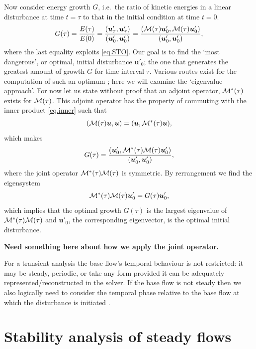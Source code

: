 \documentclass[11pt,a4paper]{report}
\newcommand{\ie}{i.e.\ }
\newcommand\uvec{\bm{u}}
\newcommand\Mop{{\cal M}}
\newcommand\Madj{{\cal M^*}}
\begin{document}
Now consider energy growth $G$, \ie the ratio of kinetic energies in a
linear disturbance at time $t=\tau$ to that in the initial condition
at time $t=0$.
\begin{equation}
G(\tau)=\frac{E(\tau)}{E(0)}=
\frac{(\bm{u}'_\tau,\bm{u}'_\tau)}{(\bm{u}'_0,\bm{u}'_0)}=
\frac{(\Mop(\tau)\bm{u}'_0,\Mop(\tau)\bm{u}'_0)}{(\bm{u}'_0,\bm{u}'_0)},
\end{equation}
where the last equality exploits \eqref{eq.STO}.  Our goal is to find
the `most dangerous', or optimal, initial disturbance $\uvec'_0$; the
one that generates the greatest amount of growth $G$ for time interval
$\tau$.  Various routes exist for the computation of such an optimum
\citep{bms12,mbs13}; here we will examine the `eigenvalue approach'.
For now let us state without proof that an adjoint operator,
$\Madj(\tau)$ exists for $\Mop(\tau)$.  This adjoint operator has the
property of commuting with the inner product \eqref{eq.inner} such
that
\begin{equation}
(\Mop(\tau)\uvec,\uvec)=(\uvec,\Madj(\tau)\uvec),
\end{equation}
which makes
\begin{equation}
G(\tau) = \frac{(\bm{u}'_0,\Madj(\tau)\Mop(\tau)\bm{u}'_0)}
{(\bm{u}'_0,\bm{u}'_0)},
\end{equation}
where the joint operator $\Madj(\tau)\Mop(\tau)$ is symmetric.  By
rerrangement we find the eigensystem
\begin{equation}
\Madj(\tau)\Mop(\tau)\bm{u}'_0 = G(\tau)\uvec'_0,
\end{equation}
which implies that the optimal growth $G(\tau)$ is the largest
eigenvalue of $\Madj(\tau)\Mop(\tau)$ and $\uvec'_0$, the
corresponding eigenvector, is the optimal initial disturbance.

\textbf{Need something here about how we apply the joint operator.}

For a transient analysis the base flow's temporal behaviour is not
restricted: it may be steady, periodic, or take any form provided it
can be adequately represented/reconstructed in the solver. If the base
flow is not steady then we also logically need to consider the
temporal phase relative to the base flow at which the disturbance is
initiated \citep[see e.g.][]{bsb08}.

\chapter{Stability analysis of steady flows}
\end{document}
